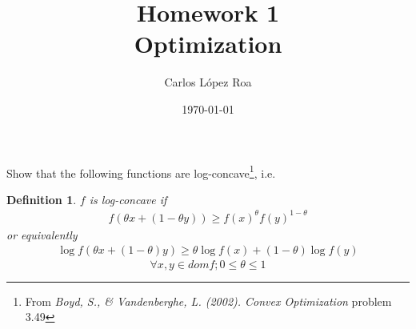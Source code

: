 \documentclass[a4paper,11pt]{article}
\title{Homework 1\\ Optimization}
\author{Carlos López Roa}
\date{\today}
\newtheorem{deff}{Definition}
\begin{document}
\maketitle
Show that the following functions are log-concave\footnote{From  \emph{Boyd, S., \& Vandenberghe, L. (2002). Convex Optimization} problem 3.49}, i.e.
\begin{deff}
$f$ is log-concave if 
\begin{equation}
\begin{aligned}
f(\theta x + (1-\theta y)) \geq f(x)^\theta f(y)^{1-\theta}
\end{aligned}
\end{equation}
 or equivalently 
\begin{equation}
\begin{aligned}
\log f(\theta x + (1-\theta)y) \geq \theta \log f(x) + (1-\theta)\log f(y)
\end{aligned}
\end{equation}
$$\forall x,y  \in dom f; 0 \leq \theta \leq 1$$ 
\end{deff}
\end{document}
